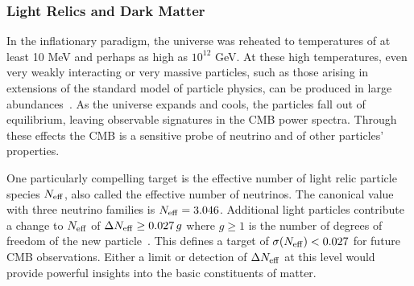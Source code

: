 
\vspace{-0.18in}

\subsubsection{Light Relics and Dark Matter}

\vspace{-0.05in}

In the inflationary paradigm, the universe was reheated to temperatures of at least 10 MeV and perhaps as high as $10^{12}$ GeV.  
At these high temperatures, even very weakly interacting or very massive particles, such as those arising 
in extensions of the standard model of particle physics, can be produced in large abundances~\cite{1979ARNPS..29..313S,Bolz:2000fu}.  As the universe expands and cools, 
the particles fall out of equilibrium, leaving observable signatures in the \ac{CMB} power spectra. 
Through these effects the CMB is a sensitive probe of neutrino and of other particles' properties.  

One particularly compelling target is the effective number of light relic particle species ${N_{\rm eff}}$, also called the effective 
number of neutrinos. The canonical value with three neutrino families is ${N_{\rm eff}} = 3.046$. Additional light particles 
contribute a change to ${N_{\rm eff}}$ of $\Delta {N_{\rm eff}} \geq 0.027\,g$ where $g \geq 1$ is the number of 
degrees of freedom of the new particle~\cite{Brust:2013xpv,Baumann:2016wac}.  
This defines a target of $\sigma({N_{\rm eff}}) < 0.027$ for future CMB observations. 
Either a limit or detection of $\Delta {N_{\rm eff}}$ at this level would provide powerful insights into the basic constituents 
of matter. 

